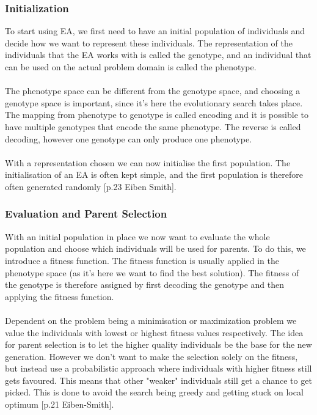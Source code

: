 \documentclass[11pt, a4paper]{article}
\begin{document}
\subsubsection{Initialization}
To start using EA, we first need to have an initial population of individuals and decide how we want to represent these individuals. The representation of the individuals that the EA works with is called the genotype, and an individual that can be used on the actual problem domain is called the phenotype.
\\
\\
The phenotype space can be different from the genotype space, and choosing a genotype space is important, since it's here the evolutionary search takes place. The mapping from phenotype to genotype is called encoding and it is possible to have multiple genotypes that encode the same phenotype. The reverse is called decoding, however one genotype can only produce one phenotype.
\\
\\
With a representation chosen we can now initialise the first population. The initialisation of an EA is often kept simple, and the first population is therefore often generated randomly [p.23 Eiben Smith].
\subsubsection{Evaluation and Parent Selection}
With an initial population in place we now want to evaluate the whole population and choose which individuals will be used for parents. To do this, we introduce a fitness function. The fitness function is usually applied in the phenotype space (as it's here we want to find the best solution). The fitness of the genotype is therefore assigned by first decoding the genotype and then applying the fitness function.
\\
\\
Dependent on the problem being a minimisation or maximization problem we value the individuals with lowest or highest fitness values respectively. The idea for parent selection is to let the higher quality individuals be the base for the new generation. However we don't want to make the selection solely on the fitness, but instead use a probabilistic approach where individuals with higher fitness still gets favoured. This means that other  "weaker" individuals still get a chance to get picked. This is done to avoid the search being greedy and getting stuck on local optimum [p.21 Eiben-Smith].
\end{document}
